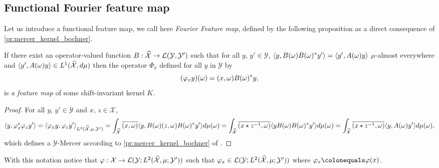 \subsection{Functional Fourier feature map}
Let us introduce a functional feature map, we call here \emph{Fourier Feature map}, defined by the following proposition as a direct consequence of \cref{pr:mercer_kernel_bochner}.

\begin{proposition}\label{pr:fourier_feature_map}
If there exist an operator-valued function $B:\widehat{\mathcal{X}}\to\mathcal{L}(\mathcal{Y},\mathcal{Y}')$ such that for all $y$, $y'\in\mathcal{Y}$, $\langle y, B(\omega)B(\omega)^* y'\rangle=\langle y', A(\omega)y\rangle$ $\mu$-almost everywhere and $\langle y', A(\omega)y\rangle\in L^1(\widehat{\mathcal{X}},d\mu)$ then the operator $\Phi_x$ defined for all $y$ in $\mathcal{Y}$ by
\begin{dmath}
\label{eq:feature_shiftinv_map}
(\Phi_x y)(\omega)=\pairing{x,\omega}B(\omega)^\adjoint y,
\end{dmath}
is \emph{a feature map} of some shift-invariant kernel $K$.
\end{proposition}
\begin{proof}
For all $y$, $y'\in \mathcal{Y}$ and $x$, $z\in\mathcal{X}$,
\begin{dmath*}
\inner{y, \Phi_x^\adjoint \Phi_z y'} = \inner{\Phi_x y, \Phi_z y'}_{L^2(\dual{\mathcal{X}},\mu,\mathcal{Y}')} \\
= \int_{\dual{\mathcal{X}}}\conj{\pairing{x,\omega}}\inner{y, B(\omega)\pairing{z,\omega}B(\omega)^\adjoint y'}d\mu(\omega) \\
= \int_{\dual{\mathcal{X}}}\conj{\pairing{x \groupop \myinv{z},\omega}}\inner{y B(\omega)B(\omega)^\adjoint y'}d\mu(\omega) \\
= \int_{\dual{\mathcal{X}}}\conj{\pairing{x \groupop \inv{z},\omega}}\inner{y,A(\omega)y'}d\mu(\omega),
\end{dmath*}
which defines a $\mathcal{Y}$-Mercer according to \cref{pr:mercer_kernel_bochner} of \citet{Carmeli2010}.
\end{proof}
With this notation notice that $\Phi: \mathcal{X} \to \mathcal{L}(\mathcal{Y}; L^2(\dual{\mathcal{X}}, \mu; \mathcal{Y}'))$ such that $\Phi_x\in \mathcal{L}(\mathcal{Y}; L^2(\dual{\mathcal{X}}, \mu; \mathcal{Y}'))$ where $\Phi_x\colonequals\Phi(x)$.


